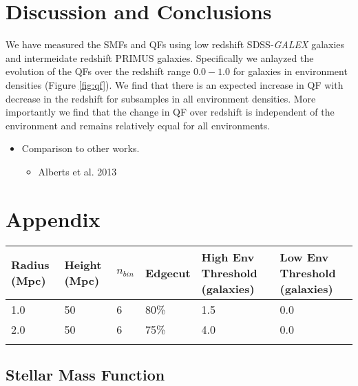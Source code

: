 \documentclass{emulateapj}
\begin{document}
\section{Discussion and Conclusions}
We have measured the SMFs and QFs using low redshift SDSS-{\em GALEX} galaxies and intermeidate redshift PRIMUS galaxies. 
Specifically we anlayzed the evolution of the QFs over the redshift range $0.0-1.0$ for galaxies in environment densities (Figure \ref{fig:qf}). 
We find that there is an expected increase in QF with decrease in the redshift for subsamples in all environment densities.
More importantly we find that the change in QF over redshift is independent of the environment and remains relatively equal for all environments. 

\begin{itemize}
    \item Comparison to other works. 
    \begin{itemize}
        \item Alberts et al. 2013 
    \end{itemize}
\end{itemize}

%
%


\section{Appendix}
\begin{table*} %
  \caption{Fixed Cylindrical Aperture Dimensions}
  \label{tab:aperture}
  \begin{center}
    \leavevmode
    \begin{tabular}{llllll} \hline \hline              
  Radius (Mpc)          &Height (Mpc)      &$n_{bin}$   &Edgecut &High Env Threshold (galaxies) &Low Env Threshold (galaxies) \\ \hline 
  1.0 &50 &6 & 80\% & 1.5 & 0.0          \\
  2.0 &50 &6 & 75\% & 4.0 & 0.0          \\ \hline
  \multicolumn{6}{l}{}                                             \\       
    \end{tabular}
  \end{center}
\end{table*}
\subsection{Stellar Mass Function} \label{sec:smf_const}
\begin{figure*}
    \begin{center}
        \leavevmode
        \label{fig:smf}
        \caption{SMF and QF for $r_{\rm{ap}}=1 \rm{Mpc}$ and $h_{\rm{ap}}=25 \rm{Mpc}$}
    \end{center}
\end{figure*}

\begin{figure*}
    \begin{center}
        \leavevmode
        \label{fig:qf}
        \caption{QF at fiducial mass for $r_{\rm{ap}}=1 \rm{Mpc}$ and $h_{\rm{ap}}=25 \rm{Mpc}$}
    \end{center}
\end{figure*}
\end{document}
